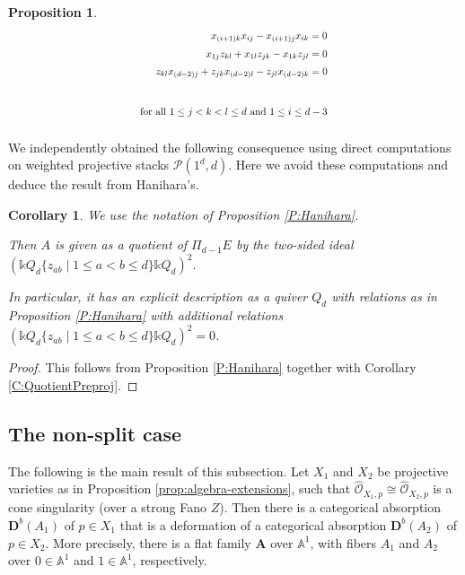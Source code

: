 \documentclass[a4paper,11pt, reqno]{amsart}
\def\AA{\mathbf A}
\def\DD{\mathbf D}
\def\Db{\DD^b}
\theoremstyle{plain}
\newtheorem{proposition}[dummy]{Proposition}
\newtheorem{corollary}[dummy]{Corollary}
\theoremstyle{definition}
\numberwithin{equation}{section}
\begin{document}
\begin{proposition}
\begin{equation*}
\begin{tikzpicture}[description/.style={fill=white,inner sep=2pt}]
\node[scale=0.8] at (2.27, 3mm){$x_{(i+1)k}x_{ij} - x_{(i+1)j}x_{ik}=0 $};

\node[scale=0.8] at (2.2, -2mm){$x_{1j}z_{kl} + x_{1l}z_{jk} - x_{1k}z_{jl}=0 $};

\node[scale=0.8] at (1.5, -7mm){$z_{kl} x_{(d-2)j} + z_{jk}x_{(d-2)l} - z_{jl} x_{(d-2)k}=0$};



\node[scale=0.8] at (1.28, -1.8){for all $1\leq j < k<l \leq d$ and  $1\leq i \leq d-3$ };

  
\end{tikzpicture}\end{equation*}
    
\end{proposition}

We independently obtained the following consequence using direct computations on weighted projective stacks $\mathcal{P}(1^d, d)$. Here we avoid these computations and deduce the result from Hanihara's.  

\begin{corollary} \label{Cor:description_R_d}
We use the notation of Proposition \ref{P:Hanihara}.

Then $A$ is given as a quotient of $\Pi_{d-1}E$ by the two-sided ideal $(\mathbb{k}Q_d \{ z_{ab} \mid 1 \leq a<b \leq d \} \mathbb{k}Q_d)^2$. 

In particular, it has an explicit description as a quiver $Q_d$ with relations as in Proposition \ref{P:Hanihara} with additional relations $(\mathbb{k}Q_d \{ z_{ab} \mid 1 \leq a<b \leq d \} \mathbb{k}Q_d)^2=0$.    
\end{corollary}
\begin{proof}
This follows from Proposition \ref{P:Hanihara} together with Corollary \ref{C:QuotientPreproj}.
\end{proof}







\subsection{The non-split case}\label{subs:non-split}

The following is the main result of this subsection. Let $X_1$ and $X_2$ be projective varieties as in Proposition \ref{prop:algebra-extensions}, such that $\widehat{\mathcal{O}}_{X_1,p} \cong \widehat{\mathcal{O}}_{X_2,p}$ is a cone singularity (over a strong Fano $Z$).
Then there is a categorical absorption $\Db(A_1 )$ of $p\in X_1$ that is a deformation of a categorical absorption $\Db(A_2)$ of $p \in X_2$. 
More precisely, there is a flat family $\AA$ over $\mathbb{A}^1$, with fibers $A_1$ and $A_2$ over $0 \in \mathbb{A}^1$ and $1 \in \mathbb{A}^1$, respectively. 
\end{document}
